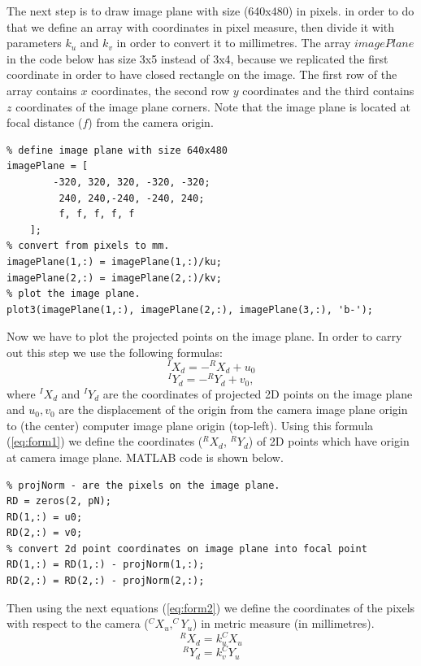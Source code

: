 \documentclass[a4paper, 10pt]{article}
\begin{document}
The next step is to draw image plane with size (640x480) in pixels. in order to do that we define an array with coordinates in pixel measure, then divide it with parameters $k_u$ and $k_v$ in order to convert it to millimetres. The array $imagePlane$ in the code below has size 3x5 instead of 3x4, because we replicated the first coordinate in order to have closed rectangle on the image. The first row of the array contains $x$ coordinates, the second row $y$ coordinates and the third contains $z$ coordinates of the image plane corners. Note that the image plane is located at focal distance ($f$) from the camera origin.
\begin{lstlisting}
% define image plane with size 640x480
imagePlane = [
        -320, 320, 320, -320, -320;
         240, 240,-240, -240, 240;
         f, f, f, f, f
    ];
% convert from pixels to mm.
imagePlane(1,:) = imagePlane(1,:)/ku;
imagePlane(2,:) = imagePlane(2,:)/kv;
% plot the image plane.
plot3(imagePlane(1,:), imagePlane(2,:), imagePlane(3,:), 'b-');
\end{lstlisting}

Now we have to plot the projected points on the image plane. In order to carry out this step we use the following formulas:
$$
^IX_d = -^RX_d+u_0
$$
\begin{equation}\label{eq:form1}
^IY_d = -^RY_d+v_0,
\end{equation}
where $^IX_d$ and $^IY_d$ are the coordinates of projected 2D points on the image plane and $u_0, v_0$ are the displacement of the origin from the camera image plane origin to (the center) computer image plane origin (top-left). Using this formula (\ref{eq:form1}) we define the coordinates ($^RX_d$, $^RY_d$) of 2D points which have origin at camera image plane. MATLAB code is shown below.

\begin{lstlisting}
% projNorm - are the pixels on the image plane.
RD = zeros(2, pN);
RD(1,:) = u0;
RD(2,:) = v0;
% convert 2d point coordinates on image plane into focal point
RD(1,:) = RD(1,:) - projNorm(1,:);
RD(2,:) = RD(2,:) - projNorm(2,:);
\end{lstlisting}

Then using the next equations (\ref{eq:form2}) we define the coordinates of the pixels with respect to the camera ($^CX_u, ^CY_u$) in metric measure (in millimetres).
$$
^RX_d = k_u^CX_u
$$
\begin{equation}\label{eq:form2}
^RY_d = k_v^CY_u
\end{equation}
\end{document}

